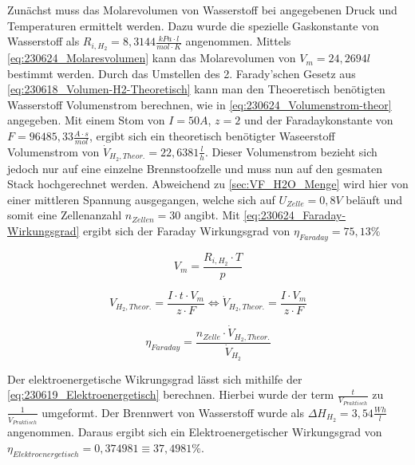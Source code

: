 
Zunächst muss das Molarevolumen von Wasserstoff bei angegebenen Druck und Temperaturen ermittelt werden.
Dazu wurde die spezielle Gaskonstante von Wasserstoff als $R_{i,H_2} = 8,3144 \frac{kPa \cdot l}{mol \cdot K}$ \cite{Gaskonstante} angenommen.
Mittels \autoref{eq:230624_Molaresvolumen} kann das Molarevolumen von $V_m = 24,2694 l$ bestimmt werden.
Durch das Umstellen des 2. Farady'schen Gesetz aus \autoref{eq:230618_Volumen-H2-Theoretisch} kann man den Theoeretisch benötigten Wasserstoff Volumenstrom berechnen, wie in \autoref{eq:230624_Volumenstrom-theor} angegeben.
Mit einem Stom von $I = 50A$, $z = 2$ und der Faradaykonstante von $F = 96485,33 \frac{A \cdot s}{mol}$, ergibt sich ein theoretisch benötigter Waseerstoff Volumenstrom von $\dot{V}_{H_2,Theor.} = 22,6381 \frac{l}{h}$.
Dieser Volumenstrom bezieht sich jedoch nur auf eine einzelne Brennstoofzelle und muss nun auf den gesmaten Stack hochgerechnet werden.
Abweichend zu \autoref{sec:VF_H2O_Menge} wird hier von einer mittleren Spannung ausgegangen, welche sich auf $U_{Zelle} = 0,8V$ beläuft und somit eine Zellenanzahl $n_{Zellen} = 30$ angibt.
Mit \autoref{eq:230624_Faraday-Wirkungsgrad} ergibt sich der Faraday Wirkungsgrad von $\eta_{Faraday} = 75,13 \%$


\begin{equation}
    V_m = \frac{R_{i,H_2} \cdot T}{p}
    \label{eq:230624_Molaresvolumen}
\end{equation}

\begin{equation}
    V_{H_2,Theor.} = \frac{I \cdot t \cdot V_m}{z \cdot F} \Leftrightarrow  \dot{V}_{H_2,Theor.} = \frac{I \cdot V_m}{z \cdot F}
    \label{eq:230624_Volumenstrom-theor}
\end{equation}

\begin{equation}
    \eta_{Faraday} = \frac{n_{Zelle} \cdot \dot{V}_{H_2,Theor.}}{\dot{V}_{H_2}}
    \label{eq:230624_Faraday-Wirkungsgrad}
\end{equation}


Der elektroenergetische Wikrungsgrad lässt sich mithilfe der \autoref{eq:230619_Elektroenergetisch} berechnen.
Hierbei wurde der term $\frac{t}{V_{Praktisch}}$ zu $\frac{1}{\dot{V}_{Praktisch}}$ umgeformt.
Der Brennwert von Wasserstoff wurde als $\Delta H_{H_2} = 3,54\frac{Wh}{l}$ \cite{dH-H2} angenommen.
Daraus ergibt sich ein Elektroenergetischer Wirkungsgrad von $\eta_{Elektroenergetisch} = 0,374981 \equiv 37,4981 \%$.

